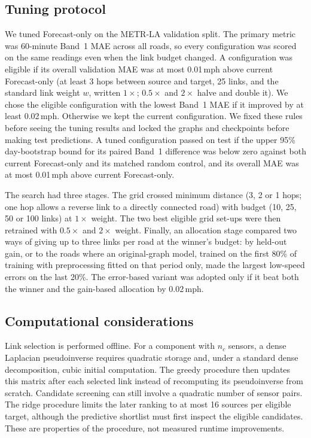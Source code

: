 \documentclass[journal]{IEEEtran}
\newcommand{\ms}{\,mph}
\begin{document}
\subsection{Tuning protocol}\label{sec:tuning-method}
We tuned Forecast-only on the METR-LA validation split. The primary metric was 60-minute Band~1 MAE across all roads, so every configuration was scored on the same readings even when the link budget changed. A configuration was eligible if its overall validation MAE was at most 0.01\ms{} above current Forecast-only (at least 3 hops between source and target, 25 links, and the standard link weight $w$, written $1\times$; $0.5\times$ and $2\times$ halve and double it). We chose the eligible configuration with the lowest Band~1 MAE if it improved by at least 0.02\ms{}. Otherwise we kept the current configuration. We fixed these rules before seeing the tuning results and locked the graphs and checkpoints before making test predictions. A tuned configuration passed on test if the upper 95\% day-bootstrap bound for its paired Band~1 difference was below zero against both current Forecast-only and its matched random control, and its overall MAE was at most 0.01\ms{} above current Forecast-only.

The search had three stages. The grid crossed minimum distance (3, 2 or 1 hops; one hop allows a reverse link to a directly connected road) with budget (10, 25, 50 or 100 links) at $1\times$ weight. The two best eligible grid set-ups were then retrained with $0.5\times$ and $2\times$ weight. Finally, an allocation stage compared two ways of giving up to three links per road at the winner's budget: by held-out gain, or to the roads where an original-graph model, trained on the first 80\% of training with preprocessing fitted on that period only, made the largest low-speed errors on the last 20\%. The error-based variant was adopted only if it beat both the winner and the gain-based allocation by 0.02\ms{}.


\subsection{Computational considerations}
Link selection is performed offline. For a component with $n_c$ sensors, a dense Laplacian pseudoinverse requires quadratic storage and, under a standard dense decomposition, cubic initial computation. The greedy procedure then updates this matrix after each selected link instead of recomputing its pseudoinverse from scratch. Candidate screening can still involve a quadratic number of sensor pairs. The ridge procedure limits the later ranking to at most 16 sources per eligible target, although the predictive shortlist must first inspect the eligible candidates. These are properties of the procedure, not measured runtime improvements.
\end{document}

